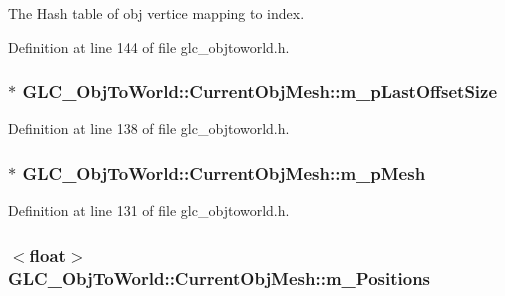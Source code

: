 The Hash table of obj vertice mapping to index. 



Definition at line 144 of file glc\-\_\-objtoworld.\-h.

\hypertarget{struct_g_l_c___obj_to_world_1_1_current_obj_mesh_a6a252d308844ef55b455c425db8d941d}{
\subsubsection[{m\-\_\-p\-Last\-Offset\-Size}]{$\ast$ G\-L\-C\-\_\-\-Obj\-To\-World\-::\-Current\-Obj\-Mesh\-::m\-\_\-p\-Last\-Offset\-Size}}\label{struct_g_l_c___obj_to_world_1_1_current_obj_mesh_a6a252d308844ef55b455c425db8d941d}


Definition at line 138 of file glc\-\_\-objtoworld.\-h.

\hypertarget{struct_g_l_c___obj_to_world_1_1_current_obj_mesh_a487f1411f369e3b2d7e36db3b45519da}{
\subsubsection[{m\-\_\-p\-Mesh}]{$\ast$ G\-L\-C\-\_\-\-Obj\-To\-World\-::\-Current\-Obj\-Mesh\-::m\-\_\-p\-Mesh}}\label{struct_g_l_c___obj_to_world_1_1_current_obj_mesh_a487f1411f369e3b2d7e36db3b45519da}


Definition at line 131 of file glc\-\_\-objtoworld.\-h.

\hypertarget{struct_g_l_c___obj_to_world_1_1_current_obj_mesh_a8e8debf639dcf41ab629fe2fe15855e9}{
\subsubsection[{m\-\_\-\-Positions}]{$<${\bf float}$>$ G\-L\-C\-\_\-\-Obj\-To\-World\-::\-Current\-Obj\-Mesh\-::m\-\_\-\-Positions}}\label{struct_g_l_c___obj_to_world_1_1_current_obj_mesh_a8e8debf639dcf41ab629fe2fe15855e9}


